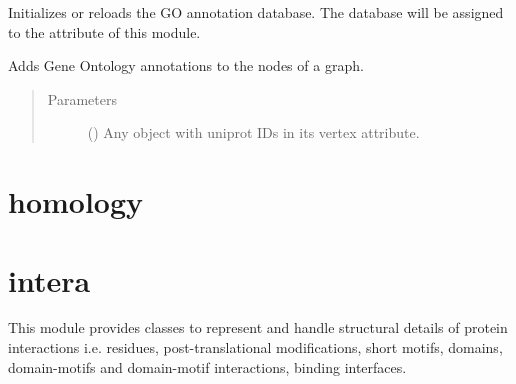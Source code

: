 \documentclass[letterpaper,10pt,english]{sphinxmanual}
\begin{document}

\begin{fulllineitems}
\label{\detokenize{reference:pypath.go.init_db}}
Initializes or reloads the GO annotation database.
The database will be assigned to the  attribute of this module.

\end{fulllineitems}


\begin{fulllineitems}
\label{\detokenize{reference:pypath.go.load_go}}
Adds Gene Ontology annotations to the nodes of a graph.
\begin{quote}\begin{description}
\item[{Parameters}] \leavevmode
{} () \textendash{} Any  object with uniprot IDs
in its  vertex attribute.

\end{description}\end{quote}

\end{fulllineitems}



\section{homology}
\label{\detokenize{reference:module-pypath.homology}}\label{\detokenize{reference:homology}}

\section{intera}
\label{\detokenize{reference:module-pypath.intera}}\label{\detokenize{reference:intera}}
This module provides classes to represent and handle
structural details of protein interactions
i.e. residues, post-translational modifications,
short motifs, domains, domain-motifs and
domain-motif interactions, binding interfaces.
\end{document}
